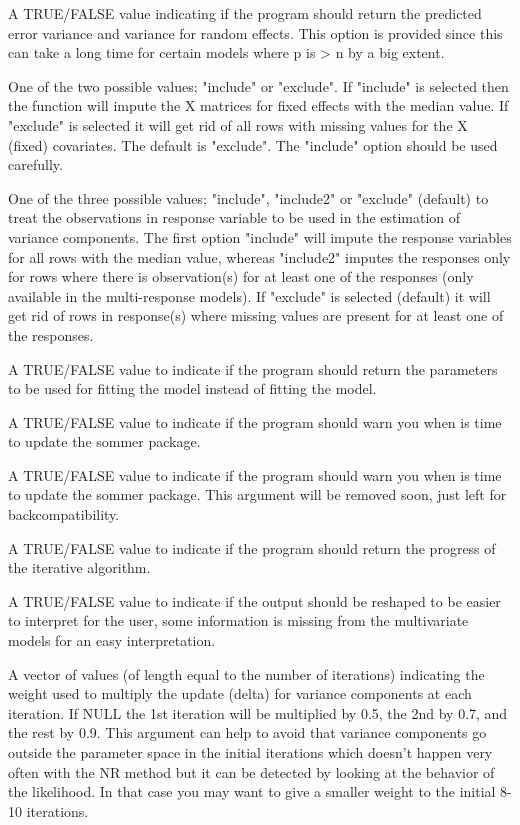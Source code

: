 \documentclass[a4paper]{book}
\begin{document}
\begin{Arguments}
\begin{ldescription}
\item[\code{getPEV}] A TRUE/FALSE value indicating if the program should return the predicted error variance and variance for random effects. This option is provided since this can take a long time for certain models where p is > n by a big extent.
\item[\code{naMethodX}] One of the two possible values; "include" or "exclude". If "include" is selected then the function will impute the X matrices for fixed effects with the median value. If "exclude" is selected it will get rid of all rows with missing values for the X (fixed) covariates. The default is "exclude". The "include" option should be used carefully.
\item[\code{naMethodY}] One of the three possible values; "include", "include2" or "exclude" (default) to treat the observations in response variable to be used in the estimation of variance components. The first option "include" will impute the response variables for all rows with the median value, whereas "include2" imputes the responses only for rows where there is observation(s) for at least one of the responses (only available in the multi-response models). If "exclude" is selected (default) it will get rid of rows in response(s) where missing values are present for at least one of the responses.
\item[\code{returnParam}] A TRUE/FALSE value to indicate if the program should return the parameters to be used for fitting the model instead of fitting the model.
\item[\code{dateWarning}] A TRUE/FALSE value to indicate if the program should warn you when is time to update the sommer package.
\item[\code{date.warning}] A TRUE/FALSE value to indicate if the program should warn you when is time to update the sommer package. This argument will be removed soon, just left for backcompatibility.
\item[\code{verbose}] A TRUE/FALSE value to indicate if the program should return the progress of the iterative algorithm.
\item[\code{reshapeOutput}] A TRUE/FALSE value to indicate if the output should be reshaped to be easier to interpret for the user, some information is missing from the multivariate models for an easy interpretation.
\item[\code{stepWeight}] A vector of values (of length equal to the number of iterations) indicating the weight used to multiply the update (delta) for variance components at each iteration. If NULL the 1st iteration will be multiplied by 0.5, the 2nd by 0.7, and the rest by 0.9. This argument can help to avoid that variance components go outside the parameter space in the initial iterations which doesn't happen very often with the NR method but it can be detected by looking at the behavior of the likelihood. In that case you may want to give a smaller weight to the initial 8-10 iterations.

\end{ldescription}
\end{Arguments}
\end{document}
